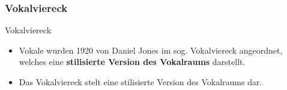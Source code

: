 \subsubsection{Vokalviereck}

\begin{frame}{Vokalviereck}

	\begin{itemize}
		\item Vokale wurden 1920 von Daniel Jones im sog. Vokalviereck angeordnet, welches eine \textbf{stilisierte Version des Vokalraums} darstellt.
		\item Das Vokalviereck stelt eine stilisierte Version des Vokalraums dar.
	\end{itemize}


\end{frame}
